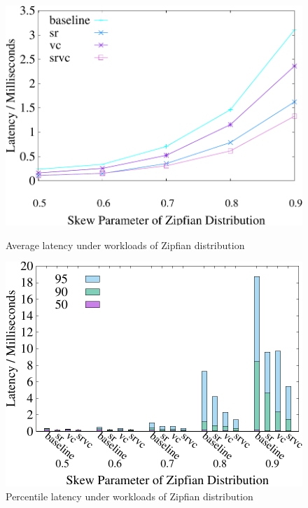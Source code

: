 \begin{figure}[t]
    \centering
    \begin{minipage}[b]{0.32\linewidth}
	\centering
	\includegraphics[width=\textwidth]{./exp_fig/basic/latency}
	\vspace{-2em}
	\caption{Average latency under workloads of Zipfian distribution}
	\label{fig:basic:latency}
	\end{minipage}
    \begin{minipage}[b]{0.32\linewidth}
	\centering
	\includegraphics[width=\textwidth]{./exp_fig/basic/percent95_latency}
	\vspace{-2em}
	\caption{Percentile latency under workloads of Zipfian distribution}
	\label{fig:basic:p95}

\end{minipage}
\end{figure}
